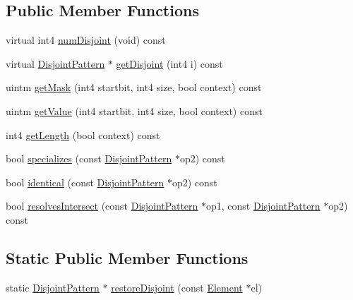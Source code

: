\subsection*{Public Member Functions}
\begin{DoxyCompactItemize}
\item 
virtual int4 \mbox{\hyperlink{class_disjoint_pattern_a33027f50347c5d747a8a473974db466f}{num\+Disjoint}} (void) const
\item 
virtual \mbox{\hyperlink{class_disjoint_pattern}{Disjoint\+Pattern}} $\ast$ \mbox{\hyperlink{class_disjoint_pattern_a4d5e45112cf698f36a5de3654efd6761}{get\+Disjoint}} (int4 i) const
\item 
uintm \mbox{\hyperlink{class_disjoint_pattern_a1bf448ce92b901dbaaf43de07f88d64e}{get\+Mask}} (int4 startbit, int4 size, bool context) const
\item 
uintm \mbox{\hyperlink{class_disjoint_pattern_aeaef820b4f6fdd9f5af67ee83cdc5a39}{get\+Value}} (int4 startbit, int4 size, bool context) const
\item 
int4 \mbox{\hyperlink{class_disjoint_pattern_a639b88b6ca8eeb7c74562fded205c601}{get\+Length}} (bool context) const
\item 
bool \mbox{\hyperlink{class_disjoint_pattern_a02be45ccd4e176e0ec68fc95a622e820}{specializes}} (const \mbox{\hyperlink{class_disjoint_pattern}{Disjoint\+Pattern}} $\ast$op2) const
\item 
bool \mbox{\hyperlink{class_disjoint_pattern_af075a6468dfdd141511aca9d222af263}{identical}} (const \mbox{\hyperlink{class_disjoint_pattern}{Disjoint\+Pattern}} $\ast$op2) const
\item 
bool \mbox{\hyperlink{class_disjoint_pattern_adda87f504c1a2673096406f78c6f62b8}{resolves\+Intersect}} (const \mbox{\hyperlink{class_disjoint_pattern}{Disjoint\+Pattern}} $\ast$op1, const \mbox{\hyperlink{class_disjoint_pattern}{Disjoint\+Pattern}} $\ast$op2) const
\end{DoxyCompactItemize}
\subsection*{Static Public Member Functions}
\begin{DoxyCompactItemize}
\item 
static \mbox{\hyperlink{class_disjoint_pattern}{Disjoint\+Pattern}} $\ast$ \mbox{\hyperlink{class_disjoint_pattern_aa9478beedbed7edf2dce73b2e8f0400d}{restore\+Disjoint}} (const \mbox{\hyperlink{class_element}{Element}} $\ast$el)
\end{DoxyCompactItemize}


